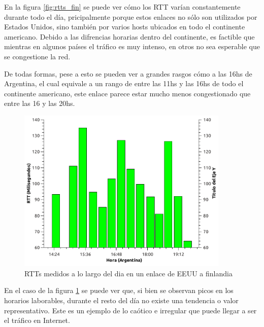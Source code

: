 
En la figura \ref{fig:rtts_fin} se puede ver cómo los RTT varían constantemente durante todo el día, pricipalmente porque estos enlaces no sólo son utilizados por Estados Unidos, sino también por varios hosts ubicados en todo el continente americano. Debido a las difrencias horarias dentro del continente, es factible que mientras en algunos países el tráfico es muy intenso, en otros no sea esperable que se congestione la red. 

De todas formas, pese a esto se pueden ver a grandes rasgos cómo a las 16hs de Argentina, el cual equivale a un rango de entre las 11hs y las 16hs de todo el continente americano, este enlace parece estar mucho menos congestionado que entre las 16 y las 20hs. 



\begin{figure}[H]
  \centering
    \includegraphics[width=0.9\textwidth]{graficos/rtts_dia_inglaterra.pdf}
    \caption{RTTs medidos a lo largo del dia en un enlace de EEUU a finlandia}
    \label{fig:rtts_ing}
\end{figure}

En el caso de la figura \ref{fig:rtts_ing} se puede ver que, si bien se observan picos en los horarios laborables, durante el resto del día no existe una tendencia o valor representativo. Este es un ejemplo de lo caótico e irregular que puede llegar a ser el tráfico en Internet.
